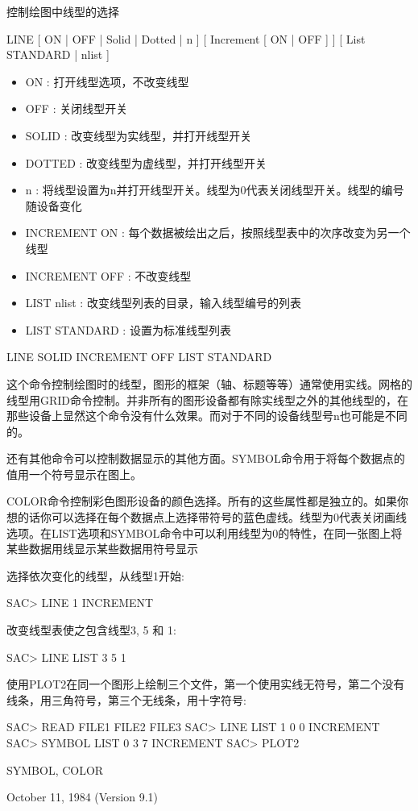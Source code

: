 \label{cmd:line}

控制绘图中线型的选择

LINE [ ON | OFF | Solid | Dotted | n ] [ Increment [ ON | OFF ] ] [ List STANDARD | nlist ]

\begin{itemize}
\item ON : 打开线型选项，不改变线型 
\item OFF : 关闭线型开关 
\item SOLID : 改变线型为实线型，并打开线型开关 
\item DOTTED : 改变线型为虚线型，并打开线型开关 
\item n : 将线型设置为n并打开线型开关。线型为0代表关闭线型开关。线型的编号随设备变化 
\item INCREMENT {ON} : 每个数据被绘出之后，按照线型表中的次序改变为另一个线型 
\item INCREMENT OFF : 不改变线型 
\item LIST nlist : 改变线型列表的目录，输入线型编号的列表 
\item LIST STANDARD : 设置为标准线型列表 
\end{itemize}

LINE SOLID INCREMENT OFF LIST STANDARD

这个命令控制绘图时的线型，图形的框架（轴、标题等等）通常使用实线。网格的线型用GRID命令控制。并非所有的图形设备都有除实线型之外的其他线型的，在那些设备上显然这个命令没有什么效果。而对于不同的设备线型号n也可能是不同的。

还有其他命令可以控制数据显示的其他方面。SYMBOL命令用于将每个数据点的值用一个符号显示在图上。

COLOR命令控制彩色图形设备的颜色选择。所有的这些属性都是独立的。如果你想的话你可以选择在每个数据点上选择带符号的蓝色虚线。线型为0代表关闭画线选项。在LIST选项和SYMBOL命令中可以利用线型为0的特性，在同一张图上将某些数据用线显示某些数据用符号显示

选择依次变化的线型，从线型1开始:
\begin{SACCode}
SAC> LINE 1 INCREMENT
\end{SACCode}

改变线型表使之包含线型3, 5 和 1:
\begin{SACCode}
SAC> LINE LIST 3 5 1
\end{SACCode}

使用PLOT2在同一个图形上绘制三个文件，第一个使用实线无符号，第二个没有线条，用三角符号，第三个无线条，用十字符号:
\begin{SACCode}
SAC> READ FILE1 FILE2 FILE3
SAC> LINE LIST 1 0 0 INCREMENT
SAC> SYMBOL LIST 0 3 7 INCREMENT
SAC> PLOT2
\end{SACCode}

SYMBOL, COLOR

October 11, 1984 (Version 9.1)
